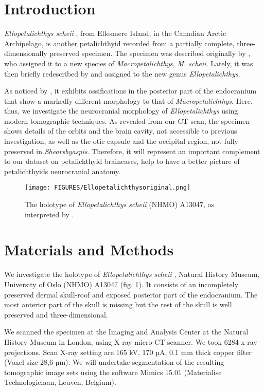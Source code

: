 \documentclass[11pt,letterpaper]{report}
\begin{document}
\section{Introduction}

 \textit{Ellopetalichthys scheii} \citealt{Kjaer1915}, from Ellesmere Island, in the Canadian Arctic Archipelago, is another petalichthyid recorded from a partially complete, three-dimensionally preserved specimen. The specimen was described originally by \cite{Kjaer1915}, who assigned it to a new species of \textit{Macropetalichthys}, \textit{M. scheii}. Lately, it was then briefly redescribed by \cite{Ørvig1957} and assigned to the new genus \textit{Ellopetalichthys}. 

 As noticed by \cite{Ørvig1957}, it exhibits ossifications in the posterior part of the endocranium that show a markedly different morphology to that of \textit{Macropetalichthys}. Here, thus, we investigate the neurocranial morphology of \textit{Ellopetalichthys} using modern tomographic techniques. As revealed from our CT scan, the specimen shows details of the orbits and the brain cavity, not accessible to previous investigation, as well as the otic capsule and the occipital region, not fully preserved in \textit{Shearsbyaspis}. Therefore, it will represent an important complement to our dataset on petalichthyid braincases, help to have a better picture of petalichthyids neurocranial anatomy.

\begin{figure}[!h]
\centering
    \texttt{[image: FIGURES/Ellopetalichthysoriginal.png]}
\caption{\footnotesize{The holotype of \textit{Ellopetalichthys scheii} (NHMO) A13047, as interpreted by \citealt{Ørvig1957}. }}
\label{ellooriginal}
\end{figure}

\section{Materials and Methods}
We investigate the holotype of \textit{Ellopetalichthys scheii} \citealt{Kjaer1915}, Natural History Museum, University of Oslo (NHMO) A13047 (fig. \ref{ellooriginal}). It consists of an incompletely preserved dermal skull-roof and exposed posterior part of the endocranium. The most anterior part of the skull is missing but the rest of the skull is well preserved and three-dimensional.

We scanned the specimen at the Imaging and Analysis Center at the Natural History Museum in London, using X-ray micro-CT scanner. We took 6284 x-ray projections. Scan X-ray setting are 165 kV, 170 µA, 0.1 mm thick copper filter (Voxel size 28,6 µm). We will undertake segmentation of the resulting tomographic image sets using the software Mimics 15.01 (Materialise Technologielaan, Leuven, Belgium). 
\end{document}
